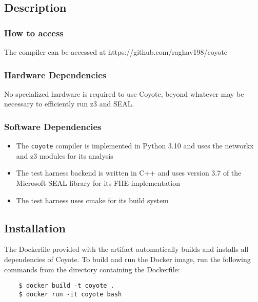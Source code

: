 \subsection{Description}

\subsubsection{How to access}

The \system compiler can be accessed at https://github.com/raghav198/coyote

\subsubsection{Hardware Dependencies}
No specialized hardware is required to use Coyote, beyond whatever may be necessary to efficiently run z3 and SEAL.

\subsubsection{Software Dependencies}
\begin{itemize}
    \item The {\tt coyote} compiler is implemented in Python 3.10 and uses the networkx and z3 modules for its analysis
    \item The test harness backend is written in C++ and uses version 3.7 of the Microsoft SEAL library for its FHE implementation
    \item The test harness uses cmake for its build system
\end{itemize}

\subsection{Installation}

The Dockerfile provided with the artifact automatically builds and installs all dependencies of Coyote. To build and run the Docker image, run the following commands from the directory containing the Dockerfile:

\begin{verbatim}
    $ docker build -t coyote .
    $ docker run -it coyote bash
\end{verbatim}

